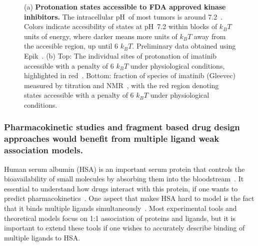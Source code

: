 \documentclass[10pt,final]{article}
\newcommand{\pH}{p$\mathrm{H}$\ }
\begin{document}
\begin{figure}[H]
\begin{subfigure}{.48\textwidth}
  \caption{}
  \label{figure:imatinib-pKa}
\end{subfigure}
\caption{(a) \textbf{Protonation states accessible to FDA approved kinase inhibitors.} 
The intracellular \pH of most tumors is around 7.2~\autocite{Griffiths1991a,Stubbs2000a}.
Colors indicate accesibility of states at \pH 7.2 within blocks of $k_BT$ units of energy, where darker means more units of $k_BT$ away from the accesible region, up until 6 $k_BT$.
Preliminary data obtained using Epik~\autocite{Shelley2007a,Greenwood2010a}.
(b) Top: The individual sites of protonation of imatinib accessible with a penalty of 6 $k_BT$ under physiological conditions, highlighted in red~\autocite{Szakacs2005a}. Bottom: fraction of species of imatinib (Gleevec) measured by titration and NMR~\autocite{Szakacs2005a}, with the red region denoting states accessible with a penalty of 6 $k_BT$ under physiological conditions.}
\label{figure:kinase-pKa}
\end{figure}


\subsubsection*{Pharmacokinetic studies and fragment based drug design approaches would benefit from multiple ligand weak association models.}
Human serum albumin (HSA) is an important serum protein that controls the bioavailability of small molecules by absorbing them into the  bloodstream~\autocite{Smith1985a,Jr.1995a}.
%
It essential to understand how drugs interact with this protein, if one wants to predict pharmacokinetics~\autocite{Smith1985a,Bannwarth1996a,Kragh-Hansen2002a,Sulkowska2002a,Zsila2011a}.
%
One aspect that makes HSA hard to model is the fact that it binds multiple ligands simultaneously~\cite{He1992a,Jr.1995a,Curry1998a,Ghuman2005a,Pal2013a}.
%
Most experimental tools and theoretical models focus on 1:1 association of proteins and ligands, but it is important to extend these tools if one wishes to accurately describe binding of multiple ligands to HSA.
\end{document}
